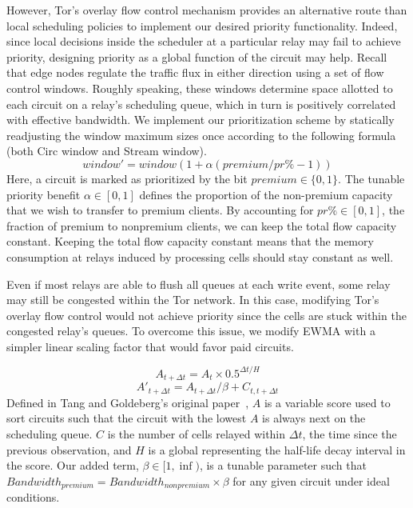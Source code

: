 However, Tor's overlay flow control mechanism provides an alternative route than 
local scheduling policies
to implement our desired priority functionality. Indeed, since local decisions 
inside the scheduler at a particular relay may fail to achieve priority, designing 
priority as a global function of the circuit may help. Recall that edge nodes 
regulate the
traffic flux in either direction using a set of flow control windows. Roughly
speaking, these windows determine space allotted to each circuit on a relay's
scheduling queue, which in turn is positively correlated with effective
bandwidth. We implement our prioritization scheme by statically readjusting the window maximum sizes once
according to the following formula (both Circ window and Stream window).
\begin{equation}
  window' = window(1+ \alpha(premium / pr\% - 1))
  \label{eq:flow}
\end{equation}
Here, a circuit is marked as prioritized by the bit
$premium \in \{0, 1\}$. The tunable priority benefit
$\alpha \in [0, 1]$ defines the proportion of the non-premium capacity that we wish
to transfer to premium clients. By accounting for
$pr\% \in [0,1]$, the fraction of premium to nonpremium clients, we
can keep the total flow capacity constant. Keeping the total flow capacity constant means that the memory consumption at relays induced by processing cells should stay constant as well.

Even if most relays are able to flush all queues at each write event, some relay may still be congested within the Tor network. In this case, modifying Tor's overlay flow control would not achieve priority since the cells are stuck within the congested relay's queues. To overcome this issue, we modify EWMA with a simpler linear scaling factor that would favor paid circuits.

\begin{equation}
  A_{t + \Delta t} = A_t \times 0.5^{\Delta t/H}
\end{equation}
\begin{equation}
  A'_{t + \Delta t} = A_{t + \Delta t} / \beta + C_{t, t + \Delta t}
\end{equation}
Defined in Tang and Goldeberg's original paper~\cite{tang2010improved}, $A$ is a variable score used to
sort circuits such that the circuit with the lowest $A$ is always next on the
scheduling queue. $C$ is the number of cells relayed within $\Delta t$, the time
since the previous observation, and $H$ is a global representing the half-life
decay interval in the score. Our added term, $\beta \in [1, \inf)$, is a tunable
parameter such that $Bandwidth_{premium} = Bandwidth_{nonpremium} \times \beta$
for any given circuit under ideal conditions.

